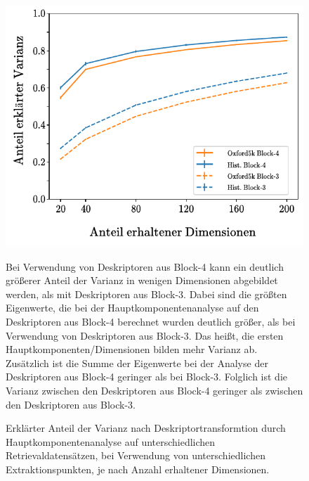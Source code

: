 \begin{figure}[h]
\begin{center}


\includegraphics[scale=1.3]{NNOPT/Anhang/explained_variance_layer4}
\caption{Erklärter Anteil der Varianz nach Deskriptortransformtion durch Hauptkomponentenanalyse auf unterschiedlichen Retrievaldatensätzen, bei Verwendung von unterschiedlichen Extraktionspunkten, je nach Anzahl erhaltener Dimensionen. }
\label{hyperopt_layer4_3}
\end{center}

Bei Verwendung von Deskriptoren aus Block-4 kann ein deutlich größerer Anteil der Varianz in wenigen Dimensionen abgebildet werden, als mit Deskriptoren aus Block-3. Dabei sind die größten Eigenwerte, die bei der Hauptkomponentenanalyse auf den Deskriptoren aus Block-4 berechnet wurden deutlich größer, als bei Verwendung von Deskriptoren aus Block-3. Das heißt, die ersten Hauptkomponenten/Dimensionen bilden mehr Varianz ab. Zusätzlich ist die Summe der Eigenwerte bei der Analyse der Deskriptoren aus Block-4 geringer als bei Block-3. Folglich ist die Varianz zwischen den Deskriptoren aus Block-4 geringer als zwischen den Deskriptoren aus Block-3.
\end{figure}


